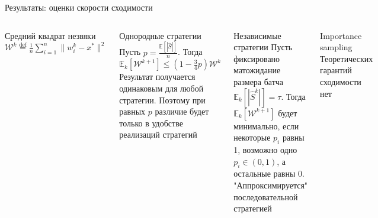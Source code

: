 \documentclass{beamer}
\begin{document}
\begin{frame}{Результаты: оценки скорости сходимости}
	
\begin{columns}[c]
	\begin{block}{Средний квадрат незвяки}
		$\mathcal W^k \overset{\text{def}} = \frac{1}{n} \sum \limits_{i=1}^n \| w_i^k - x^* \|^2$
	\end{block}
	\begin{block}{Однородные стратегии}
		Пусть $p = \frac{\mathbb E[|\hat S|]}{n}$. Тогда \\
		$ \mathbb E_k[\mathcal W^{k+1}] \leqslant \left( 1 - \frac{3}{4}p \right) \mathcal W^k$ \\
		Результат получается одинаковым для любой стратегии. Поэтому при равных $p$ различие будет только в удобстве реализаций стратегий
	\end{block}
	\begin{block}{Независимые стратегии}
		Пусть фиксировано матожидание размера батча $\mathbb E_k[|\hat S^k|] = \tau$. Тогда	$ \mathbb E_k[\mathcal W^{k+1}] $ будет минимально, если некоторые $p_i$ равны 1, возможно одно $p_i \in(0,1)$, а остальные равны $0$. "Аппроксимируется" последовательной стратегией
	\end{block}

	\begin{block}{Importance sampling}
		Теоретических гарантий сходимости нет
	\end{block}

\end{columns}
	
\end{frame}
\end{document}
